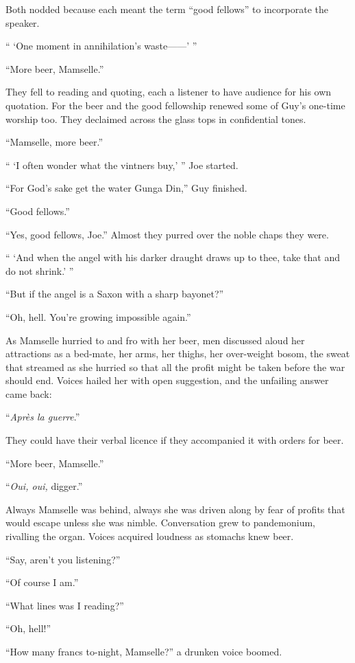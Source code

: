 Both nodded because each meant the term ``good fellows'' to incorporate the speaker.

`` `One moment in annihilation's waste------' ''

``More beer, Mamselle.''

They fell to reading and quoting, each a listener to have audience for his own quotation. For the beer and the good fellowship renewed some of Guy's one-time worship too. They declaimed across the glass tops in confidential tones.

``Mamselle, more beer.''

`` `I often wonder what the vintners buy,' '' Joe started.

``For God's sake get the water Gunga Din,'' Guy finished.

``Good fellows.''

``Yes, good fellows, Joe.'' Almost they purred over the noble chaps they were.

`` `And when the angel with his darker draught draws up to thee, take that and do not shrink.' ''

``But if the angel is a Saxon with a sharp bayonet?''

``Oh, hell. You're growing impossible again.''

As Mamselle hurried to and fro with her beer, men discussed aloud her attractions as a bed-mate, her arms, her thighs, her over-weight bosom, the sweat that streamed as she hurried so that all the profit might be taken before the war should end. Voices hailed her with open suggestion, and the unfailing answer came back:

``\textit{Apr\`{e}s la guerre}.''

They could have their verbal licence if they accompanied it with orders for beer.

``More beer, Mamselle.''

``\textit{Oui, oui,} digger.''

Always Mamselle was behind, always she was driven along by fear of profits that would escape unless she was nimble. Conversation grew to pandemonium, rivalling the organ. Voices acquired loudness as stomachs knew beer.

``Say, aren't you listening?''

``Of course I am.''

``What lines was I reading?''

``Oh, hell!''

``How many francs to-night, Mamselle?'' a drunken voice boomed.

